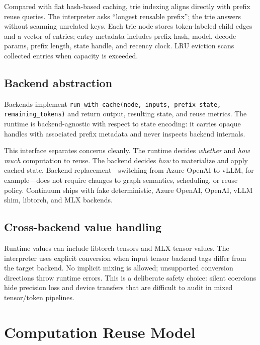 \documentclass[10pt,twocolumn]{article}
\begin{document}
Compared with flat hash-based caching, trie indexing aligns directly with prefix reuse queries. The interpreter asks ``longest reusable prefix''; the trie answers without scanning unrelated keys. Each trie node stores token-labeled child edges and a vector of entries; entry metadata includes prefix hash, model, decode params, prefix length, state handle, and recency clock. LRU eviction scans collected entries when capacity is exceeded.

\subsection{Backend abstraction}
Backends implement \texttt{run\_with\_cache(node, inputs, prefix\_state, remaining\_tokens)} and return output, resulting state, and reuse metrics. The runtime is backend-agnostic with respect to state encoding: it carries opaque handles with associated prefix metadata and never inspects backend internals.

This interface separates concerns cleanly. The runtime decides \emph{whether} and \emph{how much} computation to reuse. The backend decides \emph{how} to materialize and apply cached state. Backend replacement---switching from Azure OpenAI to vLLM, for example---does not require changes to graph semantics, scheduling, or reuse policy. Continuum ships with fake deterministic, Azure OpenAI, OpenAI, vLLM shim, libtorch, and MLX backends.

\subsection{Cross-backend value handling}
Runtime values can include libtorch tensors and MLX tensor values. The interpreter uses explicit conversion when input tensor backend tags differ from the target backend. No implicit mixing is allowed; unsupported conversion directions throw runtime errors. This is a deliberate safety choice: silent coercions hide precision loss and device transfers that are difficult to audit in mixed tensor/token pipelines.

\section{Computation Reuse Model}
\end{document}
